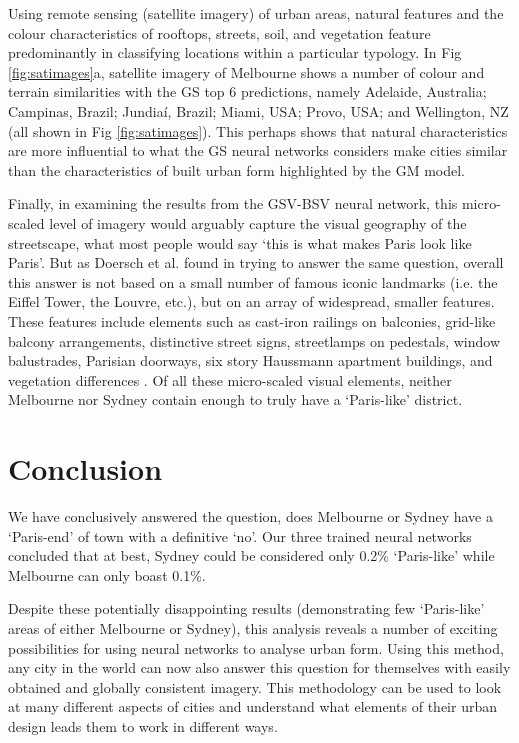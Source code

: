 \documentclass[10pt,letterpaper,hidelinks]{article}
\begin{document}
Using remote sensing (satellite imagery) of urban areas, natural features and the colour characteristics of rooftops, streets, soil, and vegetation feature predominantly in classifying locations within a particular typology. In Fig \ref{fig:satimages}a, satellite imagery of Melbourne shows a number of colour and terrain similarities with the GS top 6 predictions, namely Adelaide, Australia; Campinas, Brazil; Jundia\'{i}, Brazil; Miami, USA; Provo, USA; and Wellington, NZ (all shown in Fig \ref{fig:satimages}). This perhaps shows that natural characteristics are more influential to what the GS neural networks considers make cities similar than the characteristics of built urban form highlighted by the GM model.

Finally, in examining the results from the GSV-BSV neural network, this micro-scaled level of imagery would arguably capture the visual geography of the streetscape, what most people would say `this is what makes Paris look like Paris'. But as Doersch et al. \cite{Doersch2012} found in trying to answer the same question, overall this answer is not based on a small number of famous iconic landmarks (i.e. the Eiffel Tower, the Louvre, etc.), but on an array of widespread, smaller features. These features include elements such as cast-iron railings on balconies, grid-like balcony arrangements, distinctive street signs, streetlamps on pedestals, window balustrades, Parisian doorways,  six story Haussmann apartment buildings, and vegetation differences \cite{Li2015}. Of all these micro-scaled visual elements, neither Melbourne nor Sydney contain enough to truly have a `Paris-like' district.

\section*{Conclusion}\label{sec:conclusion}

We have conclusively answered the question, does Melbourne or Sydney have a `Paris-end' of town with a definitive `no'. Our three trained neural networks concluded that at best, Sydney could be considered only 0.2\% `Paris-like' while Melbourne can only boast 0.1\%.   

Despite these potentially disappointing results (demonstrating few `Paris-like' areas of either Melbourne or Sydney), this analysis reveals a number of exciting possibilities for using neural networks to analyse urban form. Using this method, any city in the world can now also answer this question for themselves with easily obtained and globally consistent imagery. This methodology can be used to look at many different aspects of cities and understand what elements of their urban design leads them to work in different ways.
\end{document}
